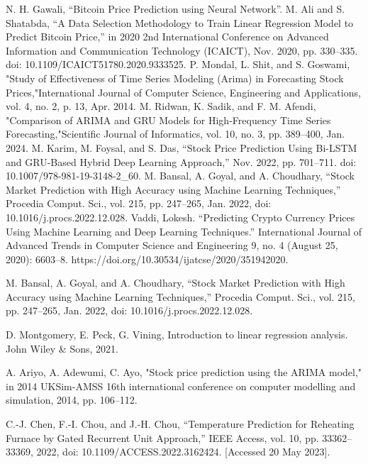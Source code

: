 \documentclass{ieeeojies}
\begin{document}
\begin{thebibliography}{00}
 N. H. Gawali, “Bitcoin Price Prediction using Neural Network”.
 M. Ali and S. Shatabda, “A Data Selection Methodology to Train Linear Regression Model to Predict Bitcoin Price,” in 2020 2nd International Conference on Advanced Information and Communication Technology (ICAICT), Nov. 2020, pp. 330–335. doi: 10.1109/ICAICT51780.2020.9333525.
 P. Mondal, L. Shit, and S. Goswami, "Study of Effectiveness of Time Series Modeling (Arima) in Forecasting Stock Prices,"International Journal
of Computer Science, Engineering and Applications, vol. 4, no. 2, p. 13, Apr. 2014.
 M. Ridwan, K. Sadik, and F. M. Afendi, "Comparison of ARIMA and
GRU Models for High-Frequency Time Series Forecasting,"Scientific
Journal of Informatics, vol. 10, no. 3, pp. 389–400, Jan. 2024.
 M. Karim, M. Foysal, and S. Das, “Stock Price Prediction Using Bi-LSTM and GRU-Based Hybrid Deep Learning Approach,” Nov. 2022, pp. 701–711. doi: 10.1007/978-981-19-3148-2\_60.
 M. Bansal, A. Goyal, and A. Choudhary, “Stock Market Prediction with High Accuracy using Machine Learning Techniques,” Procedia Comput. Sci., vol. 215, pp. 247–265, Jan. 2022, doi: 10.1016/j.procs.2022.12.028.
 Vaddi, Lokesh. “Predicting Crypto Currency Prices Using Machine Learning and Deep Learning Techniques.” International Journal of Advanced Trends in Computer Science and Engineering 9, no. 4 (August 25, 2020): 6603–8. https://doi.org/10.30534/ijatcse/2020/351942020.

 M. Bansal, A. Goyal, and A. Choudhary, “Stock Market Prediction with High Accuracy using Machine Learning Techniques,” Procedia Comput. Sci., vol. 215, pp. 247–265, Jan. 2022, doi: 10.1016/j.procs.2022.12.028.

  D. Montgomery, E. Peck, G. Vining, Introduction to linear regression analysis. John Wiley & Sons, 2021.

A. Ariyo, A. Adewumi, C. Ayo, "Stock price prediction using the ARIMA model," in 2014 UKSim-AMSS 16th international conference on computer modelling and simulation, 2014, pp. 106–112.

 C.-J. Chen, F.-I. Chou, and J.-H. Chou, “Temperature Prediction for Reheating Furnace by Gated Recurrent Unit Approach,” IEEE Access, vol. 10, pp. 33362–33369, 2022, doi: 10.1109/ACCESS.2022.3162424. [Accessed 20 May 2023].


\end{thebibliography}
\end{document}
